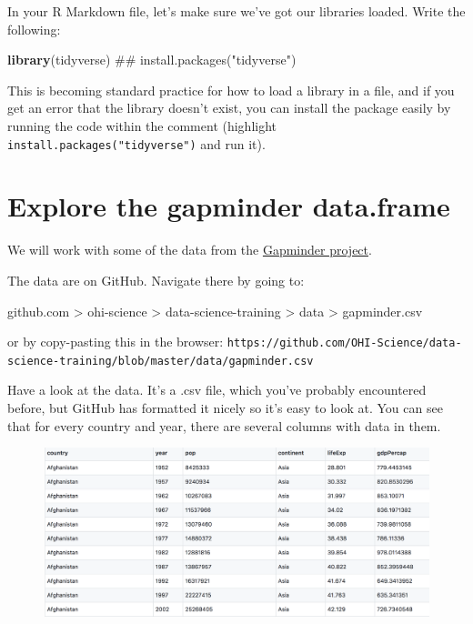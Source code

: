 \documentclass[]{book}
\newenvironment{Shaded}{\begin{snugshade}}{\end{snugshade}}
\newcommand{\KeywordTok}[1]{\textcolor[rgb]{0.13,0.29,0.53}{\textbf{#1}}}
\newcommand{\NormalTok}[1]{#1}
\theoremstyle{definition}
\theoremstyle{definition}
\theoremstyle{definition}
\theoremstyle{remark}
\begin{document}
In your R Markdown file, let's make sure we've got our libraries loaded.
Write the following:

\begin{Shaded}
\begin{Highlighting}[]
\KeywordTok{library}\NormalTok{(tidyverse)     ## install.packages("tidyverse")}
\end{Highlighting}
\end{Shaded}

This is becoming standard practice for how to load a library in a file,
and if you get an error that the library doesn't exist, you can install
the package easily by running the code within the comment (highlight
\texttt{install.packages("tidyverse")} and run it).

\section{Explore the gapminder
data.frame}\label{explore-the-gapminder-data.frame}

We will work with some of the data from the
\href{http://www.gapminder.org}{Gapminder project}.

The data are on GitHub. Navigate there by going to:

github.com \textgreater{} ohi-science \textgreater{}
data-science-training \textgreater{} data \textgreater{} gapminder.csv

or by copy-pasting this in the browser:
\texttt{https://github.com/OHI-Science/data-science-training/blob/master/data/gapminder.csv}

Have a look at the data. It's a .csv file, which you've probably
encountered before, but GitHub has formatted it nicely so it's easy to
look at. You can see that for every country and year, there are several
columns with data in them.

\begin{figure}
\centering
\includegraphics{img/gapminder_gh.png}
\caption{}
\end{figure}
\end{document}
